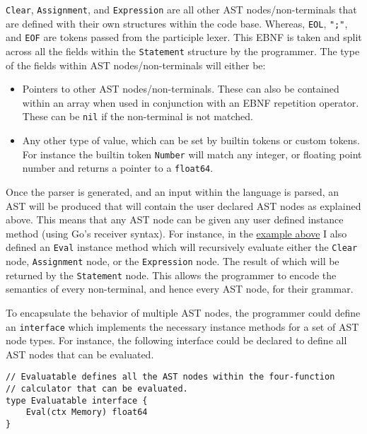 \verb|Clear|, \verb|Assignment|, and \verb|Expression| are all other AST nodes/non-terminals that are defined with their own structures within the code base. Whereas, \verb|EOL|, \verb|";"|, and \verb|EOF| are tokens passed from the participle lexer. This EBNF is taken and split across all the fields within the \verb|Statement| structure by the programmer. The type of the fields within AST nodes/non-terminals will either be:

\begin{itemize}
    \item Pointers to other AST nodes/non-terminals. These can also be contained within an array when used in conjunction with an EBNF repetition operator. These can be \texttt{nil} if the non-terminal is not matched.
    \item Any other type of value, which can be set by builtin tokens or custom tokens. For instance the builtin token \verb|Number| will match any integer, or floating point number and returns a pointer to a \texttt{float64}.
\end{itemize}

Once the parser is generated, and an input within the language is parsed, an AST will be produced that will contain the user declared AST nodes as explained above. This means that any AST node can be given any user defined instance method (using Go's receiver syntax). For instance, in the \hyperref[fig:four-func-calc-statement-ast-node]{example above} I also defined an \verb|Eval| instance method which will recursively evaluate either the \verb|Clear| node, \verb|Assignment| node, or the \verb|Expression| node. The result of which will be returned by the \verb|Statement| node. This allows the programmer to encode the semantics of every non-terminal, and hence every AST node, for their grammar.

To encapsulate the behavior of multiple AST nodes, the programmer could define an \texttt{interface} which implements the necessary instance methods for a set of AST node types. For instance, the following interface could be declared to define all AST nodes that can be evaluated.

\begin{verbatim}
// Evaluatable defines all the AST nodes within the four-function 
// calculator that can be evaluated.
type Evaluatable interface {
    Eval(ctx Memory) float64
}
\end{verbatim}

